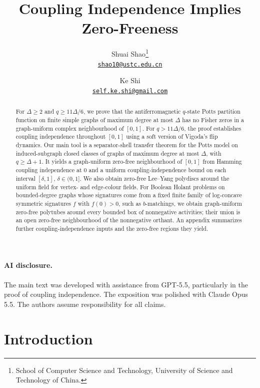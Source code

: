 \documentclass[11pt,reqno]{article}
\title{\bfseries Coupling Independence Implies Zero-Freeness}
\author{Shuai Shao\thanks{School of Computer Science and Technology,
    University of Science and Technology of China.}\\
  \href{mailto:shao10@ustc.edu.cn}{\texttt{shao10@ustc.edu.cn}}
\and
Ke Shi\footnotemark[1]\\
\href{mailto:self.ke.shi@gmail.com}{\texttt{self.ke.shi@gmail.com}}}
\date{}
\theoremstyle{plain}
\theoremstyle{definition}
\theoremstyle{remark}
\theoremstyle{definition}
\theoremstyle{remark}
\begin{document}
\maketitle

\begin{abstract}
For \(\Delta\ge2\) and \(q\ge11\Delta/6\), we prove that the antiferromagnetic
\(q\)-state Potts partition function on finite simple graphs of maximum
degree at most \(\Delta\) has no Fisher zeros in a graph-uniform complex
neighbourhood of \([0,1]\).  For \(q>11\Delta/6\), the proof establishes
coupling independence throughout \([0,1]\) using a soft version
of Vigoda's flip dynamics.  Our main tool is a separator-shell transfer
theorem for the Potts model on induced-subgraph closed classes of graphs
of maximum degree at most \(\Delta\), with \(q\ge\Delta+1\).  It yields a
graph-uniform zero-free neighbourhood of \([0,1]\) from Hamming coupling
independence at \(0\) and a uniform coupling-independence bound on each
interval \([\delta,1]\), \(\delta\in(0,1]\).  We also obtain zero-free Lee--Yang
polydiscs around the uniform field for vertex- and edge-colour fields.
For Boolean Holant problems on bounded-degree graphs whose signatures
come from a fixed finite family of log-concave symmetric signatures \(f\)
with \(f(0)>0\), such as \(b\)-matchings, we obtain graph-uniform zero-free
polytubes around every bounded box of nonnegative activities; their
union is an open zero-free neighbourhood of the nonnegative orthant.
An appendix summarizes further coupling-independence
inputs and the zero-free regions they yield.
\end{abstract}

\paragraph*{AI disclosure.}
The main text was developed with assistance from GPT-5.5, particularly
in the proof of coupling independence.  The exposition was polished
with Claude Opus 5.5.  The authors assume responsibility for all claims.

\setcounter{tocdepth}{2}
\tableofcontents


\section{Introduction}
\label{sec:intro}
\end{document}
